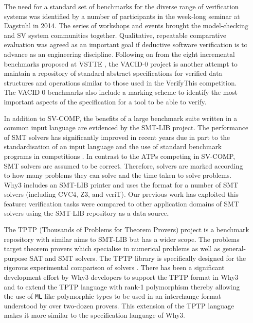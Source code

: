 The need for a standard set of benchmarks for the diverse range of verification systems was identified by a number of participants in the week-long seminar at Dagstuhl \cite{Dagstuhl} in 2014. The series of workshops and events brought the model-checking and SV system communities together. Qualitative, repeatable comparative evaluation was agreed as an important goal if deductive software verification is to advance as an engineering discipline. Following on from the eight incremental benchmarks proposed at VSTTE \cite{Weide2008}, the VACID-0 \cite{Leino10vacid-0:verification} project is another attempt to maintain a repository of standard abstract specifications for verified data structures and operations similar to those used in the VerifyThis competition. The VACID-0 benchmarks also include a marking scheme to identify the most important aspects of the specification for a tool to be able to verify.

In addition to SV-COMP, the benefits of a large benchmark suite written in a common input language are evidenced by the SMT-LIB \cite{SMTLIB} project. 
The performance of SMT solvers has significantly improved in recent years due in part to the standardisation of an input language and the use of standard benchmark programs in competitions \cite{SMTEVAL2013}. 
In contrast to the ATPs competing in SV-COMP, SMT solvers are assumed to be correct. Therefore, solvers are marked according to how many problems they can solve and the time taken to solve problems.
\textsf{Why3} includes an SMT-LIB printer and uses the format for a number of SMT solvers (including CVC4, Z3, and veriT). Our previous work \cite{Healy:2016} has exploited this feature: verification tasks were compared to other application domains of SMT solvers using the SMT-LIB repository as a data source.

The TPTP (Thousands of Problems for Theorem Provers) project \cite{TPTP} is a benchmark repository with similar aims to SMT-LIB but has a wider scope. The problems target theorem provers which specialise in numerical problems as well as general-purpose SAT and SMT solvers. The TPTP library is specifically designed for the rigorous experimental comparison of solvers \cite{Sutcliffe200139}. There has been a significant development effort by \textsf{Why3} developers to support the TPTP format in \textsf{Why3} and to extend the TPTP language with rank-1 polymorphism \cite{why:tptp} thereby allowing the use of \texttt{ML}-like polymorphic types to be used in an interchange format understood by over two-dozen provers. This extension of the TPTP language makes it more similar to the specification language of \textsf{Why3}.   \\

